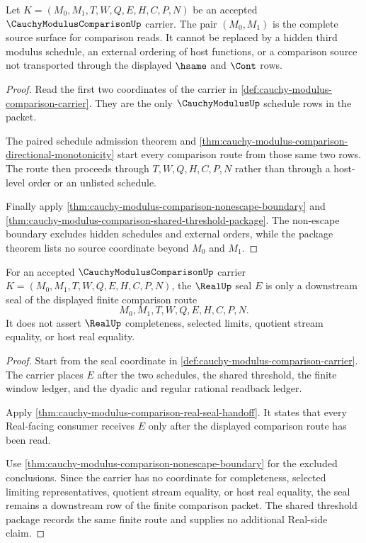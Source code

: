 \begin{theorem}
\label{thm:cauchy-modulus-comparison-schedule-pair-source-lock}
Let $K=(M_0,M_1,T,W,Q,E,H,C,P,N)$ be an accepted $\CauchyModulusComparisonUp$ carrier. The pair $(M_0,M_1)$ is the complete source surface for comparison reads. It cannot be replaced by a hidden third modulus schedule, an external ordering of host functions, or a comparison source not transported through the displayed $\hsame$ and $\Cont$ rows.
\end{theorem}
\begin{proof}
Read the first two coordinates of the carrier in \autoref{def:cauchy-modulus-comparison-carrier}. They are the only $\CauchyModulusUp$ schedule rows in the packet.

The paired schedule admission theorem and \autoref{thm:cauchy-modulus-comparison-directional-monotonicity} start every comparison route from those same two rows. The route then proceeds through $T,W,Q,H,C,P,N$ rather than through a host-level order or an unlisted schedule.

Finally apply \autoref{thm:cauchy-modulus-comparison-nonescape-boundary} and \autoref{thm:cauchy-modulus-comparison-shared-threshold-package}. The non-escape boundary excludes hidden schedules and external orders, while the package theorem lists no source coordinate beyond $M_0$ and $M_1$.
\end{proof}

\begin{theorem}
\label{thm:cauchy-modulus-comparison-real-seal-comparison-nonescape}
For an accepted $\CauchyModulusComparisonUp$ carrier $K=(M_0,M_1,T,W,Q,E,H,C,P,N)$, the $\RealUp$ seal $E$ is only a downstream seal of the displayed finite comparison route
$$
M_0,M_1,T,W,Q,E,H,C,P,N.
$$
It does not assert $\RealUp$ completeness, selected limits, quotient stream equality, or host real equality.
\end{theorem}
\begin{proof}
Start from the seal coordinate in \autoref{def:cauchy-modulus-comparison-carrier}. The carrier places $E$ after the two schedules, the shared threshold, the finite window ledger, and the dyadic and regular rational readback ledger.

Apply \autoref{thm:cauchy-modulus-comparison-real-seal-handoff}. It states that every Real-facing consumer receives $E$ only after the displayed comparison route has been read.

Use \autoref{thm:cauchy-modulus-comparison-nonescape-boundary} for the excluded conclusions. Since the carrier has no coordinate for completeness, selected limiting representatives, quotient stream equality, or host real equality, the seal remains a downstream row of the finite comparison packet. The shared threshold package records the same finite route and supplies no additional Real-side claim.
\end{proof}

